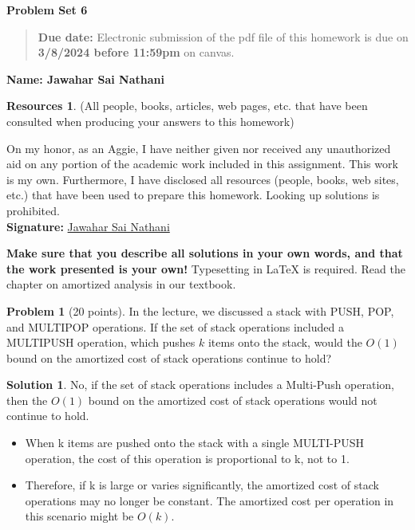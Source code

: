 \documentclass{article}
\theoremstyle{definition}
\newtheorem{problem}{Problem}
\newtheorem*{solution}{Solution}
\newtheorem*{resources}{Resources}
\newcommand{\name}[1]{\noindent\textbf{Name: #1}}
\newcommand{\honor}{\noindent On my honor, as an Aggie, I have neither
  given nor received any unauthorized aid on any portion of the
  academic work included in this assignment. This work is my own. Furthermore, I have
  disclosed all resources (people, books, web sites, etc.) that have
  been used to prepare this homework. Looking up solutions is prohibited. \\[1ex]
 \textbf{Signature:} \underline{Jawahar Sai Nathani}{\hspace*{5cm}} }
\newcommand{\problemset}[1]{\begin{center}\textbf{Problem Set
      #1}\end{center}}
\newcommand{\duedate}[1]{\begin{quote}\textbf{Due date:} Electronic
    submission of the pdf file of this homework is due on
    \textbf{#1} on canvas. \end{quote} }
\begin{document}
\problemset{6}
\duedate{3/8/2024 before 11:59pm}
\name{Jawahar Sai Nathani}
\begin{resources} (All people, books, articles, web pages, etc. that
  have been consulted when producing your answers to this homework)
\end{resources}
\honor

\newpage
\textbf{Make sure that you describe all solutions in your own
words, and that the work presented is your own!} Typesetting in
\LaTeX{} is required. Read the chapter on amortized analysis in our textbook. 

\begin{problem}[20 points] In the lecture, we discussed a stack with
  PUSH, POP, and MULTIPOP operations.  If the set of stack operations
  included a MULTIPUSH operation, which pushes $k$ items onto the
  stack, would the $O(1)$ bound on the amortized cost of stack
  operations continue to hold?
\end{problem}
\begin{solution}
No, if the set of stack operations includes a Multi-Push operation, then the $O(1)$ bound on the amortized cost of stack operations would not continue to hold.
\begin{itemize}
    \item When k items are pushed onto the stack with a single MULTI-PUSH operation, the cost of this operation is proportional to k, not to 1.
    \item Therefore, if k is large or varies significantly, the amortized cost of stack operations may no longer be constant. The amortized cost per operation in this scenario might be $O(k)$.
\end{itemize}
\end{solution}
\end{document}
